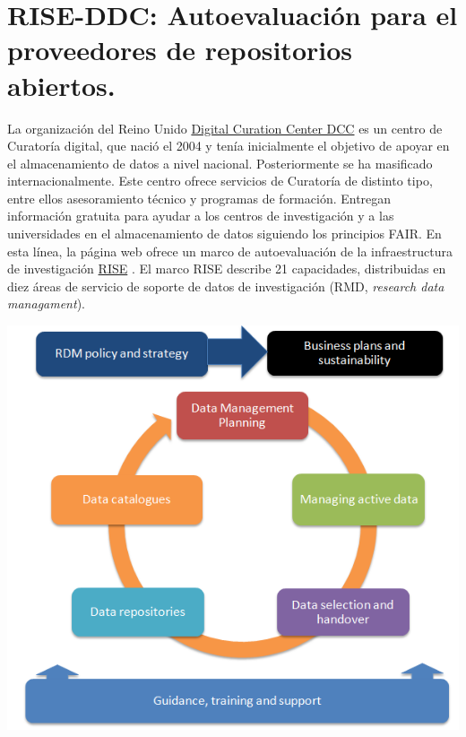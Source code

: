 \documentclass[
  14pt,
]{book}
\let\origfigure\figure
\let\endorigfigure\endfigure
\renewenvironment{figure}[1][2] {
  \expandafter\origfigure\expandafter[H]
} {
  \endorigfigure
}
\begin{document}
\hypertarget{rise-ddc-autoevaluaciuxf3n-para-el-proveedores-de-repositorios-abiertos.}{%
\section{RISE-DDC: Autoevaluación para el proveedores de repositorios abiertos.}\label{rise-ddc-autoevaluaciuxf3n-para-el-proveedores-de-repositorios-abiertos.}}

La organización del Reino Unido \href{https://www.dcc.ac.uk/}{Digital Curation Center DCC} es un centro de Curatoría digital, que nació el 2004 y tenía inicialmente el objetivo de apoyar en el almacenamiento de datos a nivel nacional. Posteriormente se ha masificado internacionalmente. Este centro ofrece servicios de Curatoría de distinto tipo, entre ellos asesoramiento técnico y programas de formación. Entregan información gratuita para ayudar a los centros de investigación y a las universidades en el almacenamiento de datos siguiendo los principios FAIR. En esta línea, la página web ofrece un marco de autoevaluación de la infraestructura de investigación \href{https://www.dcc.ac.uk/guidance/how-guides/RISE}{RISE} \citep{ddc_Using_2017}. El marco RISE describe 21 capacidades, distribuidas en diez áreas de servicio de soporte de datos de investigación (RMD, \emph{research data managament}).

\begin{figure}[!ht]

{\centering \includegraphics[width=0.8\linewidth,]{RDMcomponents} 

}

\caption{Propuesta RISE-DDI}\label{fig:unnamed-chunk-22}
\end{figure}
\end{document}
